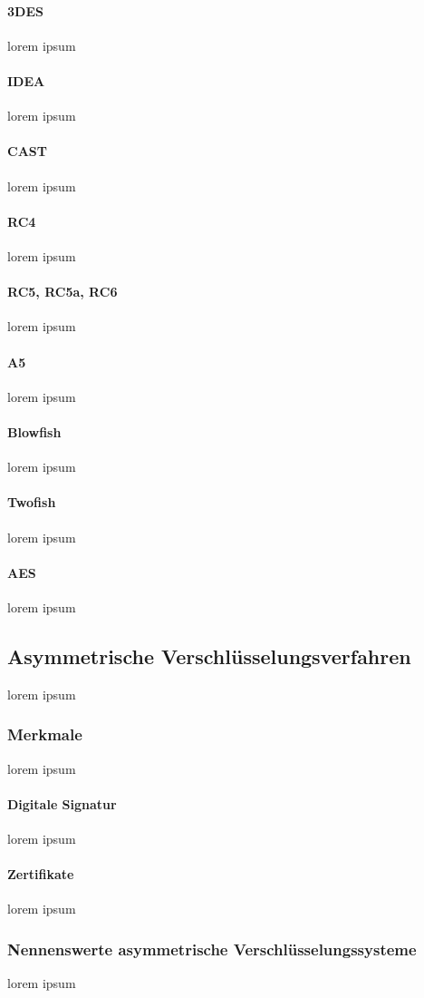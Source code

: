 \documentclass[12pt,a4paper]{report}
\begin{document}
\paragraph{3DES}
lorem ipsum
\paragraph{IDEA}
lorem ipsum
\paragraph{CAST}
lorem ipsum
\paragraph{RC4}
lorem ipsum
\paragraph{RC5, RC5a, RC6}
lorem ipsum
\paragraph{A5}
lorem ipsum
\paragraph{Blowfish}
lorem ipsum
\paragraph{Twofish}
lorem ipsum
\paragraph{AES}
lorem ipsum
\subsection{Asymmetrische Verschlüsselungsverfahren}
lorem ipsum
\subsubsection{Merkmale}
lorem ipsum
\paragraph{Digitale Signatur}
lorem ipsum
\paragraph{Zertifikate}
lorem ipsum
\subsubsection{Nennenswerte asymmetrische Verschlüsselungssysteme}
lorem ipsum
\end{document}
